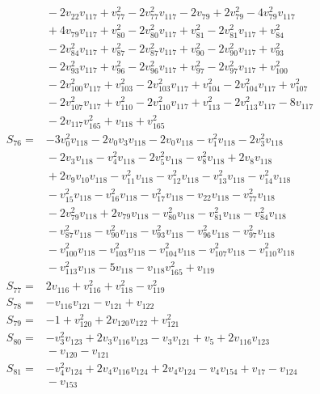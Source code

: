 \documentclass[11pt]{article}
\begin{document}
\begin{align*}
&{}-2v_{22}v_{117}+v_{77}^{2}-2v_{77}^{2}v_{117}-2v_{79}+2v_{79}^{2}-4v_{79}^{2}v_{117}\\
&{}+4v_{79}v_{117}+v_{80}^{2}-2v_{80}^{2}v_{117}+v_{81}^{2}-2v_{81}^{2}v_{117}+v_{84}^{2}\\
&{}-2v_{84}^{2}v_{117}+v_{87}^{2}-2v_{87}^{2}v_{117}+v_{90}^{2}-2v_{90}^{2}v_{117}+v_{93}^{2}\\
&{}-2v_{93}^{2}v_{117}+v_{96}^{2}-2v_{96}^{2}v_{117}+v_{97}^{2}-2v_{97}^{2}v_{117}+v_{100}^{2}\\
&{}-2v_{100}^{2}v_{117}+v_{103}^{2}-2v_{103}^{2}v_{117}+v_{104}^{2}-2v_{104}^{2}v_{117}+v_{107}^{2}\\
&{}-2v_{107}^{2}v_{117}+v_{110}^{2}-2v_{110}^{2}v_{117}+v_{113}^{2}-2v_{113}^{2}v_{117}-8v_{117}\\
&{}-2v_{117}v_{165}^{2}+v_{118}+v_{165}^{2}\\
S_{76}={}&-3v_{0}^{2}v_{118}-2v_{0}v_{3}v_{118}-2v_{0}v_{118}-v_{1}^{2}v_{118}-2v_{3}^{2}v_{118}\\
&{}-2v_{3}v_{118}-v_{4}^{2}v_{118}-2v_{5}^{2}v_{118}-v_{8}^{2}v_{118}+2v_{8}v_{118}\\
&{}+2v_{9}v_{10}v_{118}-v_{11}^{2}v_{118}-v_{12}^{2}v_{118}-v_{13}^{2}v_{118}-v_{14}^{2}v_{118}\\
&{}-v_{15}^{2}v_{118}-v_{16}^{2}v_{118}-v_{17}^{2}v_{118}-v_{22}v_{118}-v_{77}^{2}v_{118}\\
&{}-2v_{79}^{2}v_{118}+2v_{79}v_{118}-v_{80}^{2}v_{118}-v_{81}^{2}v_{118}-v_{84}^{2}v_{118}\\
&{}-v_{87}^{2}v_{118}-v_{90}^{2}v_{118}-v_{93}^{2}v_{118}-v_{96}^{2}v_{118}-v_{97}^{2}v_{118}\\
&{}-v_{100}^{2}v_{118}-v_{103}^{2}v_{118}-v_{104}^{2}v_{118}-v_{107}^{2}v_{118}-v_{110}^{2}v_{118}\\
&{}-v_{113}^{2}v_{118}-5v_{118}-v_{118}v_{165}^{2}+v_{119}\\
S_{77}={}&2v_{116}+v_{116}^{2}+v_{118}^{2}-v_{119}^{2}\\
S_{78}={}&-v_{116}v_{121}-v_{121}+v_{122}\\
S_{79}={}&-1+v_{120}^{2}+2v_{120}v_{122}+v_{121}^{2}\\
S_{80}={}&-v_{3}^{2}v_{123}+2v_{3}v_{116}v_{123}-v_{3}v_{121}+v_{5}+2v_{116}v_{123}\\
&{}-v_{120}-v_{121}\\
S_{81}={}&-v_{4}^{2}v_{124}+2v_{4}v_{116}v_{124}+2v_{4}v_{124}-v_{4}v_{154}+v_{17}-v_{124}\\
&{}-v_{153}\\

\end{align*}
\end{document}

